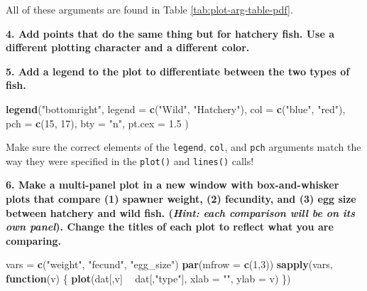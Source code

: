 \documentclass[]{book}
\newenvironment{Shaded}{\begin{snugshade}}{\end{snugshade}}
\newcommand{\KeywordTok}[1]{\textcolor[rgb]{0.13,0.29,0.53}{\textbf{#1}}}
\newcommand{\DataTypeTok}[1]{\textcolor[rgb]{0.13,0.29,0.53}{#1}}
\newcommand{\DecValTok}[1]{\textcolor[rgb]{0.00,0.00,0.81}{#1}}
\newcommand{\FloatTok}[1]{\textcolor[rgb]{0.00,0.00,0.81}{#1}}
\newcommand{\StringTok}[1]{\textcolor[rgb]{0.31,0.60,0.02}{#1}}
\newcommand{\ControlFlowTok}[1]{\textcolor[rgb]{0.13,0.29,0.53}{\textbf{#1}}}
\newcommand{\OperatorTok}[1]{\textcolor[rgb]{0.81,0.36,0.00}{\textbf{#1}}}
\newcommand{\NormalTok}[1]{#1}
\theoremstyle{definition}
\theoremstyle{definition}
\theoremstyle{definition}
\theoremstyle{remark}
\begin{document}
All of these arguments are found in Table \ref{tab:plot-arg-table-pdf}.

\textbf{4. Add points that do the same thing but for hatchery fish. Use
a different plotting character and a different color.}

\begin{Shaded}
\end{Shaded}

\textbf{5. Add a legend to the plot to differentiate between the two
types of fish.}

\begin{Shaded}
\begin{Highlighting}[]
\KeywordTok{legend}\NormalTok{(}\StringTok{"bottomright"}\NormalTok{,}
       \DataTypeTok{legend =} \KeywordTok{c}\NormalTok{(}\StringTok{"Wild"}\NormalTok{, }\StringTok{"Hatchery"}\NormalTok{),}
       \DataTypeTok{col =} \KeywordTok{c}\NormalTok{(}\StringTok{"blue"}\NormalTok{, }\StringTok{"red"}\NormalTok{),}
       \DataTypeTok{pch =} \KeywordTok{c}\NormalTok{(}\DecValTok{15}\NormalTok{, }\DecValTok{17}\NormalTok{),}
       \DataTypeTok{bty =} \StringTok{"n"}\NormalTok{,}
       \DataTypeTok{pt.cex =} \FloatTok{1.5}
\NormalTok{)}
\end{Highlighting}
\end{Shaded}

Make sure the correct elements of the \texttt{legend}, \texttt{col}, and
\texttt{pch} arguments match the way they were specified in the
\texttt{plot()} and \texttt{lines()} calls!

\textbf{6. Make a multi-panel plot in a new window with box-and-whisker
plots that compare (1) spawner weight, (2) fecundity, and (3) egg size
between hatchery and wild fish. (\emph{Hint: each comparison will be on
its own panel}). Change the titles of each plot to reflect what you are
comparing.}

\begin{Shaded}
\begin{Highlighting}[]
\NormalTok{vars =}\StringTok{ }\KeywordTok{c}\NormalTok{(}\StringTok{"weight"}\NormalTok{, }\StringTok{"fecund"}\NormalTok{, }\StringTok{"egg_size"}\NormalTok{)}
\KeywordTok{par}\NormalTok{(}\DataTypeTok{mfrow =} \KeywordTok{c}\NormalTok{(}\DecValTok{1}\NormalTok{,}\DecValTok{3}\NormalTok{))}
\KeywordTok{sapply}\NormalTok{(vars, }\ControlFlowTok{function}\NormalTok{(v) \{}
  \KeywordTok{plot}\NormalTok{(dat[,v] }\OperatorTok{~}\StringTok{ }\NormalTok{dat[,}\StringTok{"type"}\NormalTok{], }\DataTypeTok{xlab =} \StringTok{""}\NormalTok{, }\DataTypeTok{ylab =}\NormalTok{ v)}
\NormalTok{\})}
\end{Highlighting}
\end{Shaded}
\end{document}
